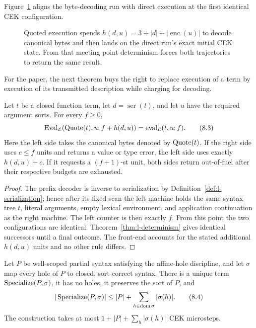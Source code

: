 Figure~\ref{fig:quote-eval} aligns the byte-decoding run with direct execution
at the first identical CEK configuration.
\begin{figure}[t]
\centering

\caption{Quoted execution spends \(h(d,u)=3+|d|+|\operatorname{enc}(u)|\) to decode canonical bytes and then lands on the direct run's exact initial CEK state.  From that meeting point determinism forces both trajectories to return the same result.}
\label{fig:quote-eval}
\end{figure}

For the paper, the next theorem buys the right to replace execution of a term
by execution of its transmitted description while charging for decoding.
\begin{theorem}
\label{thm:quote-eval}\enspace%
Let \(t\) be a closed function term, let \(d=\operatorname{ser}(t)\), and let
\(u\) have the required argument sorts.  For every \(f\geq0\),
\[
 \operatorname{Eval}_{\mathcal L}(\operatorname{Quote}(t),u;f+h(d,u))
   =\operatorname{eval}_{\mathcal L}(t,u;f).
\tag{8.3}\label{eq:quote-eval}
\]
Here the left side takes the canonical bytes denoted by \(\operatorname{Quote}(t)\).  If the
right side uses \(c\leq f\) units and returns a value or type error, the left
side uses exactly \(h(d,u)+c\).  If it requests a \((f+1)\)-st unit, both sides
return out-of-fuel after their respective budgets are exhausted.
\end{theorem}

\begin{proof}
The prefix decoder is inverse to serialization by
Definition~\ref{def:l-serialization}; hence after its fixed scan the left
machine holds the same syntax tree \(t\), literal arguments, empty lexical
environment, and application continuation as the right machine.  The left
counter is then exactly \(f\).  From this point the two configurations are
identical.  Theorem~\ref{thm:l-determinism} gives identical successors until a
final outcome.  The front-end accounts for the stated additional
\(h(d,u)\) units and no other rule differs.
\end{proof}

\begin{lemma}
\label{lem:specialization}\enspace%
Let \(P\) be well-scoped partial syntax satisfying the affine-hole discipline,
and let \(\sigma\) map every hole of \(P\) to closed, sort-correct syntax.
There is a unique term \(\operatorname{Specialize}(P,\sigma)\), it has no holes, it preserves
the sort of \(P\), and
\[
 |\operatorname{Specialize}(P,\sigma)|
 \leq |P|+\sum_{h\in\operatorname{dom}\sigma}|\sigma(h)|.
\tag{8.4}\label{eq:specialize-size}
\]
The construction takes at most \(1+|P|+\sum_h|\sigma(h)|\) CEK microsteps.
\end{lemma}

